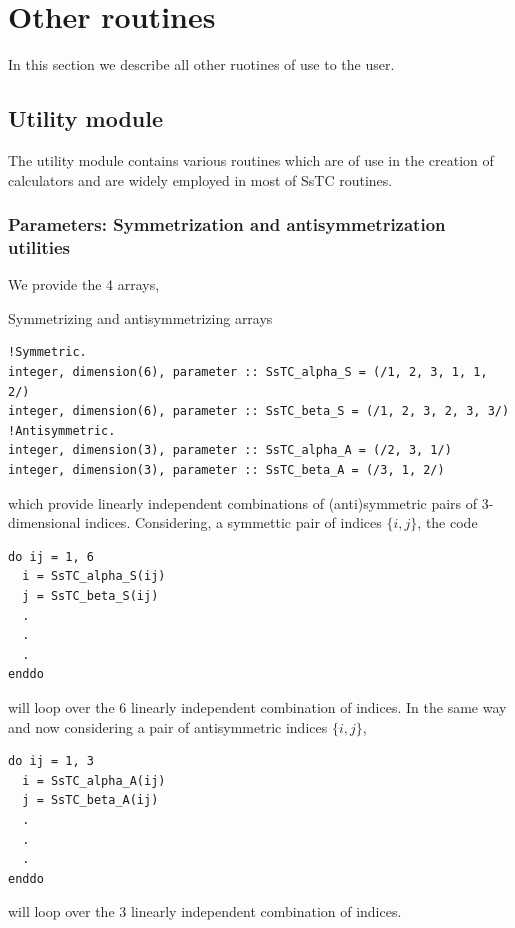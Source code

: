 \documentclass[10pt,a4paper]{article}
\begin{document}
\section{Other routines}
In this section we describe all other ruotines of use to the user.
\subsection{Utility module}
The utility module contains various routines which are of use in the creation of calculators and are widely employed in most of SsTC routines.
\subsubsection{Parameters: Symmetrization and antisymmetrization utilities}
We provide the 4 arrays,
\begin{codebox}{Symmetrizing and antisymmetrizing arrays}
\begin{lstlisting}[caption={Symmetrization and antisymmetrization arrays.},captionpos=b]
!Symmetric.
integer, dimension(6), parameter :: SsTC_alpha_S = (/1, 2, 3, 1, 1, 2/)
integer, dimension(6), parameter :: SsTC_beta_S = (/1, 2, 3, 2, 3, 3/)
!Antisymmetric.
integer, dimension(3), parameter :: SsTC_alpha_A = (/2, 3, 1/)
integer, dimension(3), parameter :: SsTC_beta_A = (/3, 1, 2/)
\end{lstlisting}
\end{codebox}
which provide linearly independent combinations of (anti)symmetric pairs of 3-dimensional indices. Considering, a symmettic pair of indices $\{i, j\}$, the code
\begin{codebox}{}
\begin{lstlisting}[caption={Loop over symmetric pair of indices.},captionpos=b]
do ij = 1, 6
  i = SsTC_alpha_S(ij)
  j = SsTC_beta_S(ij)
  .
  .
  .
enddo
\end{lstlisting}
\end{codebox}
will loop over the 6 linearly independent combination of indices. In the same way and now considering a pair of antisymmetric indices $\{i, j\}$,
\begin{codebox}{}
\begin{lstlisting}[caption={Loop over antisymmetric pair of indices.},captionpos=b]
do ij = 1, 3
  i = SsTC_alpha_A(ij)
  j = SsTC_beta_A(ij)
  .
  .
  .
enddo
\end{lstlisting}
\end{codebox}
will loop over the 3 linearly independent combination of indices.
\end{document}
